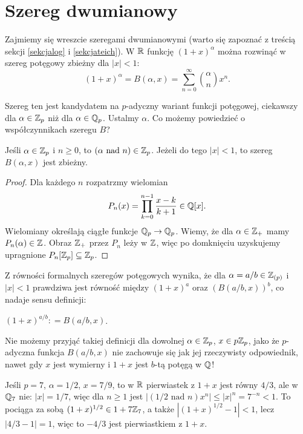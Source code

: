 \section{Szereg dwumianowy}
Zajmiemy  się wreszcie szeregami dwumianowymi (warto się zapoznać z treścią sekcji \ref{sekcjalog} i \ref{sekcjateich}).
W $\mathbb R$ funkcję $(1+x)^\alpha$ można rozwinąć w szereg potęgowy zbieżny dla $|x| < 1$:
\[
	(1+x)^\alpha = B(\alpha, x) = \sum_{n = 0}^\infty {\alpha \choose n} x^n.
\]

Szereg ten jest kandydatem na $p$-adyczny wariant funkcji potęgowej, ciekawszy dla $\alpha \in \mathbb Z_p$ niż dla $\alpha \in \mathbb Q_p$.
Ustalmy $\alpha$.
Co możemy powiedzieć o współczynnikach szeregu $B$?

\begin{fakt}
	Jeśli $\alpha \in \mathbb Z_p$ i $n \ge 0$, to $(\alpha \textrm{ nad } n) \in \mathbb Z_p$.
	Jeżeli do tego $|x| < 1$, to szereg $B(\alpha, x)$ jest zbieżny.
\end{fakt}

\begin{proof}
	Dla każdego $n$ rozpatrzmy wielomian
	\[
		P_n(x) = \prod_{k = 0}^{n-1} \frac{x - k}{k+1} \in \mathbb Q[x].
	\]
	Wielomiany określają ciągłe funkcje $\mathbb Q_p \to \mathbb Q_p$.
	Wiemy, że dla $\alpha \in \mathbb Z_+$ mamy $P_n(\alpha) \in \mathbb Z$.
	Obraz $\mathbb Z_+$ przez $P_n$ leży w $\mathbb Z$, więc po domknięciu uzyskujemy upragnione  $P_n[\mathbb Z_p] \subseteq \mathbb Z_p$.
\end{proof}

Z równości formalnych szeregów potęgowych wynika, że dla $\alpha = a/b \in \mathbb Z_{(p)}$ i $|x| < 1$ prawdziwa jest równość między $(1+x)^a$ oraz $(B(a/b, x))^b$, co nadaje sensu definicji:

\begin{definicja}
	$(1 + x)^{a/b} : = B(a/b, x)$.
\end{definicja}

Nie możemy przyjąć takiej definicji dla dowolnej $\alpha \in \mathbb Z_p$, $x \in p\mathbb Z_p$, jako że $p$-adyczna funkcja $B(a/b, x)$ nie zachowuje się jak jej rzeczywisty odpowiednik, nawet gdy $x$ jest wymierny i $1+x$ jest $b$-tą potęgą w $\mathbb Q$!

\begin{przyklad}[Koblitz]
	Jeśli $p = 7$, $\alpha = 1/2$, $x = 7/9$, to w $\mathbb R$ pierwiastek z $1+x$ jest równy $4/3$, ale w $\mathbb Q_7$ nie: $|x| = 1/7$, więc dla $n \ge 1$ jest $|(1/2 \textrm{ nad } n) x^n| \le |x|^n = 7^{-n} < 1$.
	To pociąga za sobą $(1+ x)^{1/2} \in 1 + 7 \mathbb Z_7$, a także $|(1+x)^{1/2} - 1| < 1$, lecz $|4/3 - 1| = 1$, więc to $-4/3$ jest pierwiastkiem z $1+x$.
\end{przyklad}


